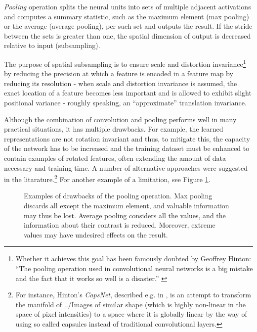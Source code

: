 \documentclass[11pt,czech,american,dvipsnames]{book}
\begin{document}
\emph{Pooling} operation splits the neural units into sets of multiple adjacent activations and computes a summary statistic, such as the maximum element (max pooling) or the average (average pooling), per such set and outputs the result. If the stride between the sets is greater than one, the spatial dimension of output is decreased relative to input (subsampling).

The purpose of spatial subsampling is to ensure scale and distortion invariance\footnote{Whether it achieves this goal has been famously doubted by Geoffrey Hinton: ``The pooling operation used in convolutional neural networks is a big mistake and the fact that it works so well is a disaster.'' \cite{}} by reducing the precision at which a feature is encoded in a feature map by reducing its resolution - when scale and distortion invariance is assumed, the exact location of a feature becomes less important and is allowed to exhibit slight positional variance - roughly speaking, an ``approximate'' translation invariance.

Although the combination of convolution and pooling performs well in many practical situations, it has multiple drawbacks. For example, the learned representations are not rotation invariant and thus, to mitigate this, the capacity of the network has to be increased and the training dataset must be enhanced to contain examples of rotated features, often extending the amount of data necessary and training time. A number of alternative approaches were suggested in the litarature.\footnote{For instance, Hinton's \emph{CapsNet}, described e.g. in \cite{sabour2017}, is an attempt to transform the manifold of ../Images of similar shape (which is highly non-linear in the space of pixel intensities) to a space where it is globally linear by the way of using so called capsules instead of traditional convolutional layers.} For another example of a limitation, see Figure \ref{fig:drawbacks}.

\begin{figure} 
\centering
\noindent{}
  \caption{Examples of drawbacks of the pooling operation. Max pooling discards all except the maximum element, and valuable information may thus be lost. Average pooling considers all the values, and the information about their contrast is reduced. Moreover, extreme values may have undesired effects on the result. \cite{yu2014}}
\label{fig:drawbacks}
\end{figure}
\end{document}

